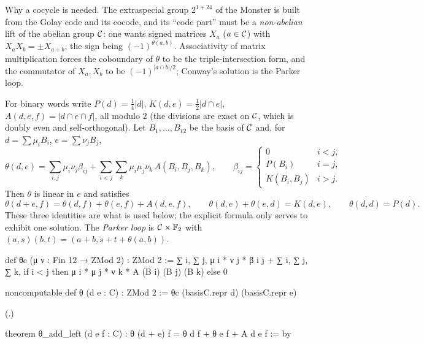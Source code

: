 Why a cocycle is needed.  The extraspecial group $2^{1+24}$ of the Monster is built from the Golay code
and its cocode, and its ``code part'' must be a \emph{non-abelian} lift of the abelian group
$\mathcal{C}$: one wants signed matrices $X_a$ ($a\in\mathcal{C}$) with $X_aX_b=\pm X_{a+b}$, the sign being
$(-1)^{\theta(a,b)}$.  Associativity of matrix multiplication forces the coboundary of $\theta$ to be
the triple-intersection form, and the commutator of $X_a,X_b$ to be $(-1)^{|a\cap b|/2}$; Conway's
solution is the Parker loop.

\begin{definition}\label{ch21:def:theta}
For binary words write $P(d)=\tfrac14|d|$, $K(d,e)=\tfrac12|d\cap e|$, $A(d,e,f)=|d\cap e\cap f|$,
all modulo $2$ (the divisions are exact on $\mathcal{C}$, which is doubly even and self-orthogonal).  Let
$B_1,\dots,B_{12}$ be the basis  of $\mathcal{C}$ and, for $d=\sum\mu_iB_i$, $e=\sum\nu_jB_j$,
\begin{equation*}
  \theta(d,e)=\sum_{i,j}\mu_i\nu_j\beta_{ij}+\sum_{i<j}\sum_k\mu_i\mu_j\nu_k\,A(B_i,B_j,B_k),\qquad
  \beta_{ij}=\begin{cases}0&i<j,\\P(B_i)&i=j,\\K(B_i,B_j)&i>j.\end{cases}
\end{equation*}
Then $\theta$ is linear in $e$ and satisfies
\begin{equation*}
  \theta(d+e,f)=\theta(d,f)+\theta(e,f)+A(d,e,f),\qquad\theta(d,e)+\theta(e,d)=K(d,e),\qquad\theta(d,d)=P(d).
\end{equation*}
These three identities are what is used below; the explicit formula only serves to exhibit one
solution.  The \emph{Parker loop} is $\mathcal{C}\times\mathbb{F}_2$ with $(a,s)(b,t)=(a+b,s+t+\theta(a,b))$.
\end{definition}
\begin{leancode}
def θc (μ ν : Fin 12 → ZMod 2) : ZMod 2 :=
  ∑ i, ∑ j, μ i * ν j * β i j +
    ∑ i, ∑ j, ∑ k, if i < j then μ i * μ j * ν k * A (B i) (B j) (B k) else 0

noncomputable def θ (d e : C) : ZMod 2 := θc (basisC.repr d) (basisC.repr e)
\end{leancode}
(.)
\begin{leancode}
theorem θ_add_left (d e f : C) : θ (d + e) f = θ d f + θ e f + A d e f := by
\end{leancode}
